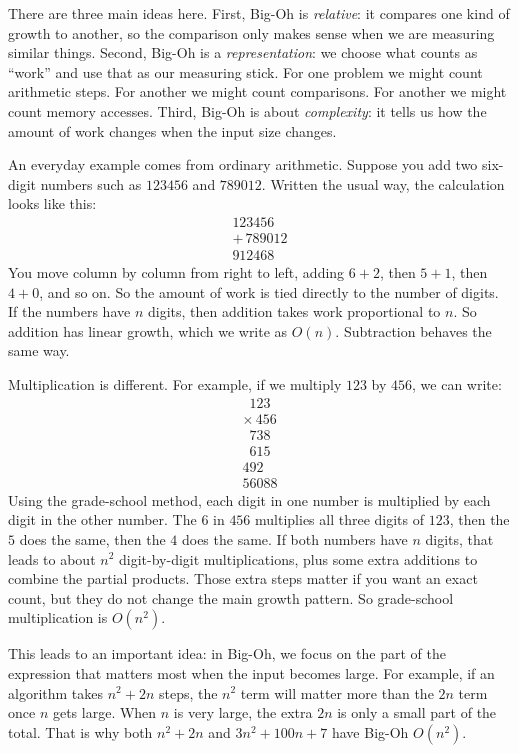 \documentclass[11pt,oneside]{book}
\theoremstyle{definition}
\begin{document}
There are three main ideas here.
First, Big-Oh is \emph{relative}: it compares one kind of growth to another, so the comparison only makes sense when we are measuring similar things.
Second, Big-Oh is a \emph{representation}: we choose what counts as ``work'' and use that as our measuring stick.
For one problem we might count arithmetic steps.
For another we might count comparisons.
For another we might count memory accesses.
Third, Big-Oh is about \emph{complexity}: it tells us how the amount of work changes when the input size changes.

An everyday example comes from ordinary arithmetic.
Suppose you add two six-digit numbers such as $123456$ and $789012$.
Written the usual way, the calculation looks like this:
\[
\begin{array}{r}
    123456 \\
+\,789012 \\
\hline
    912468
\end{array}
\]
You move column by column from right to left, adding $6 + 2$, then $5 + 1$, then $4 + 0$, and so on.
So the amount of work is tied directly to the number of digits.
If the numbers have $n$ digits, then addition takes work proportional to $n$.
So addition has linear growth, which we write as $O(n)$.
Subtraction behaves the same way.

Multiplication is different.
For example, if we multiply $123$ by $456$, we can write:
\[
\begin{array}{r}
     \phantom{0}123 \\
\times\,456 \\
\hline
     \phantom{0}738 \\
    \phantom{0}615 \\
    492 \\
\hline
    56088
\end{array}
\]
Using the grade-school method, each digit in one number is multiplied by each digit in the other number.
The $6$ in $456$ multiplies all three digits of $123$, then the $5$ does the same, then the $4$ does the same.
If both numbers have $n$ digits, that leads to about $n^{2}$ digit-by-digit multiplications, plus some extra additions to combine the partial products.
Those extra steps matter if you want an exact count, but they do not change the main growth pattern.
So grade-school multiplication is $O(n^{2})$.

This leads to an important idea: in Big-Oh, we focus on the part of the expression that matters most when the input becomes large.
For example, if an algorithm takes $n^{2} + 2n$ steps, the $n^{2}$ term will matter more than the $2n$ term once $n$ gets large.
When $n$ is very large, the extra $2n$ is only a small part of the total.
That is why both $n^{2} + 2n$ and $3n^{2} + 100n + 7$ have Big-Oh $O(n^{2})$.
\end{document}

